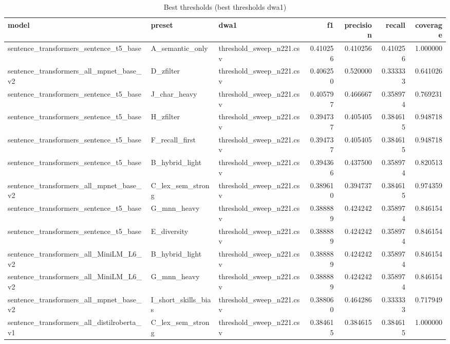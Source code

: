 \begin{table}[!ht]
\centering
\caption{Best thresholds (best thresholds dwa1)}
\label{tab:best\_thresholds\_dwa1}
\begin{tabular}{lllrrrr}
\hline
model & preset & dwa1 & f1 & precision & recall & coverage \\
\hline
sentence\_transformers\_sentence\_t5\_base & A\_semantic\_only & threshold\_sweep\_n221.csv & 0.410256 & 0.410256 & 0.410256 & 1.000000 \\
sentence\_transformers\_all\_mpnet\_base\_v2 & D\_zfilter & threshold\_sweep\_n221.csv & 0.406250 & 0.520000 & 0.333333 & 0.641026 \\
sentence\_transformers\_sentence\_t5\_base & J\_char\_heavy & threshold\_sweep\_n221.csv & 0.405797 & 0.466667 & 0.358974 & 0.769231 \\
sentence\_transformers\_sentence\_t5\_base & H\_zfilter & threshold\_sweep\_n221.csv & 0.394737 & 0.405405 & 0.384615 & 0.948718 \\
sentence\_transformers\_sentence\_t5\_base & F\_recall\_first & threshold\_sweep\_n221.csv & 0.394737 & 0.405405 & 0.384615 & 0.948718 \\
sentence\_transformers\_sentence\_t5\_base & B\_hybrid\_light & threshold\_sweep\_n221.csv & 0.394366 & 0.437500 & 0.358974 & 0.820513 \\
sentence\_transformers\_all\_mpnet\_base\_v2 & C\_lex\_sem\_strong & threshold\_sweep\_n221.csv & 0.389610 & 0.394737 & 0.384615 & 0.974359 \\
sentence\_transformers\_sentence\_t5\_base & G\_mnn\_heavy & threshold\_sweep\_n221.csv & 0.388889 & 0.424242 & 0.358974 & 0.846154 \\
sentence\_transformers\_sentence\_t5\_base & E\_diversity & threshold\_sweep\_n221.csv & 0.388889 & 0.424242 & 0.358974 & 0.846154 \\
sentence\_transformers\_all\_MiniLM\_L6\_v2 & B\_hybrid\_light & threshold\_sweep\_n221.csv & 0.388889 & 0.424242 & 0.358974 & 0.846154 \\
sentence\_transformers\_all\_MiniLM\_L6\_v2 & G\_mnn\_heavy & threshold\_sweep\_n221.csv & 0.388889 & 0.424242 & 0.358974 & 0.846154 \\
sentence\_transformers\_all\_mpnet\_base\_v2 & I\_short\_skills\_bias & threshold\_sweep\_n221.csv & 0.388060 & 0.464286 & 0.333333 & 0.717949 \\
sentence\_transformers\_all\_distilroberta\_v1 & C\_lex\_sem\_strong & threshold\_sweep\_n221.csv & 0.384615 & 0.384615 & 0.384615 & 1.000000 \\

\end{tabular}
\end{table}

